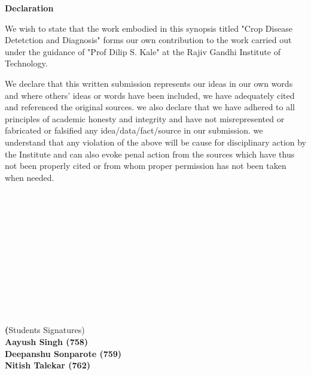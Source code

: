 \newpage
\thispagestyle{empty}
\vspace*{0.2cm}
\vspace{1cm}
\begin{center}
 \large\textbf{Declaration}
\end{center}
\vspace{1.5cm}

We wish to state that the work embodied in this synopsis titled "Crop Disease Detetction and Diagnosis" forms our own contribution to the work carried out under the guidance of "Prof Dilip S. Kale" at the Rajiv Gandhi Institute of Technology.\par We declare that this written submission represents our ideas in our own words and where others' ideas or words have been included, we have adequately cited and referenced the original sources. we also declare that we have adhered to all principles of academic honesty and integrity and have not misrepresented or fabricated or falsified any idea/data/fact/source in our submission. we understand that any violation of the above will be cause for disciplinary action by the Institute and can also evoke penal action from the sources which have thus not been properly cited or from whom proper permission has not been taken when needed.
\\
\\
\\
\\
\\
\\
\\
\\
\\ 
\\
\\
\\
\\
\textbf(Students Signatures)\\
\hspace{1 mm} \textbf{Aayush Singh (758)}\\
\hspace{1 mm} \textbf{Deepanshu Sonparote (759)}\\
\hspace{1 mm} \textbf{Nitish Talekar (762)}\\

\newpage

